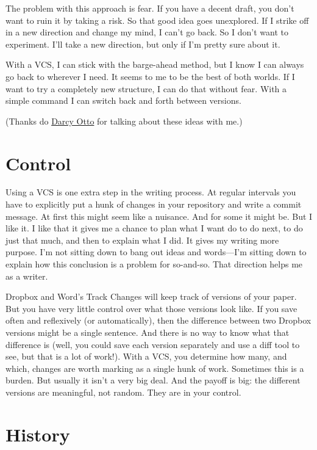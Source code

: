 \documentclass{article}
\begin{document}
The problem with this approach is fear. If you have a decent draft, 
you don’t want to ruin it by taking a risk. So that good idea goes 
unexplored. If I strike off in a new direction and change my mind, I 
can’t go back. So I don’t want to experiment. I’ll take a new 
direction, but only if I’m pretty sure about it.

With a VCS, I can stick with the barge-ahead method, but I know I can 
always go back to wherever I need. It seems to me to be the best of 
both worlds. If I want to try a completely new structure, I can do 
that without fear. With a simple command I can switch back and forth 
between versions.

(Thanks do 
\href{http://philosophy.csusb.edu/~dotto/me/Home.html}{Darcy Otto} for 
talking about these ideas with me.)

\section{Control}

Using a VCS is one extra step in the writing process. At regular 
intervals you have to explicitly put a hunk of changes in your 
repository and write a commit message. At first this might seem like a 
nuisance. And for some it might be. But I like it. I like that it 
gives me a chance to plan what I want do to do next, to do just that 
much, and then to explain what I did. It gives my writing more 
purpose. I’m not sitting down to bang out ideas and words—I’m sitting 
down to explain how this conclusion is a problem for so-and-so. That 
direction helps me as a writer.

Dropbox and Word’s Track Changes will keep track of versions of your 
paper. But you have very little control over what those versions look 
like. If you save often and reflexively (or automatically), then the 
difference between two Dropbox versions might be a single sentence. 
And there is no way to know what that difference is (well, you could 
save each version separately and use a diff tool to see, but that is a 
lot of work!). With a VCS, you determine how many, and which, changes 
are worth marking as a single hunk of work. Sometimes this is a 
burden. But usually it isn’t a very big deal. And the payoff is big: 
the different versions are meaningful, not random. They are in your 
control.

\section{History}
\end{document}
